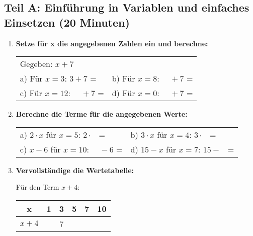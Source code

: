 \subsection*{Teil A: Einführung in Variablen und einfaches Einsetzen (20 Minuten)}

\begin{enumerate}[label=\arabic*.]

    \item \textbf{Setze für x die angegebenen Zahlen ein und berechne:}

    \vspace{0.5cm}

    \begin{tabular}{ll}
        Gegeben: $x + 7$ & \\[2ex]
        a) Für $x = 3$: $3 + 7$ = \underline{\hspace{2cm}} & b) Für $x = 8$: $\phantom{00} + 7$ = \underline{\hspace{2cm}} \\[3ex]
        c) Für $x = 12$: $\phantom{00} + 7$ = \underline{\hspace{2cm}} & d) Für $x = 0$: $\phantom{00} + 7$ = \underline{\hspace{2cm}}
    \end{tabular}

    \vspace{1cm}

    \item \textbf{Berechne die Terme für die angegebenen Werte:}

    \vspace{0.5cm}

    \begin{tabular}{ll}
        a) $2 \cdot x$ für $x = 5$: $2 \cdot \phantom{0}$ = \underline{\hspace{2cm}} & b) $3 \cdot x$ für $x = 4$: $3 \cdot \phantom{0}$ = \underline{\hspace{2cm}} \\[3ex]
        c) $x - 6$ für $x = 10$: $\phantom{00} - 6$ = \underline{\hspace{2cm}} & d) $15 - x$ für $x = 7$: $15 - \phantom{0}$ = \underline{\hspace{2cm}}
    \end{tabular}

    \vspace{1cm}

    \item \textbf{Vervollständige die Wertetabelle:}

    \vspace{0.5cm}

    Für den Term $x + 4$:

    \begin{center}
        \begin{tabular}{|c|c|c|c|c|c|}
            \hline
            x & 1 & 3 & 5 & 7 & 10 \\
            \hline
            $x + 4$ & & 7 & & & \\
            \hline
        \end{tabular}
    \end{center}

\end{enumerate}